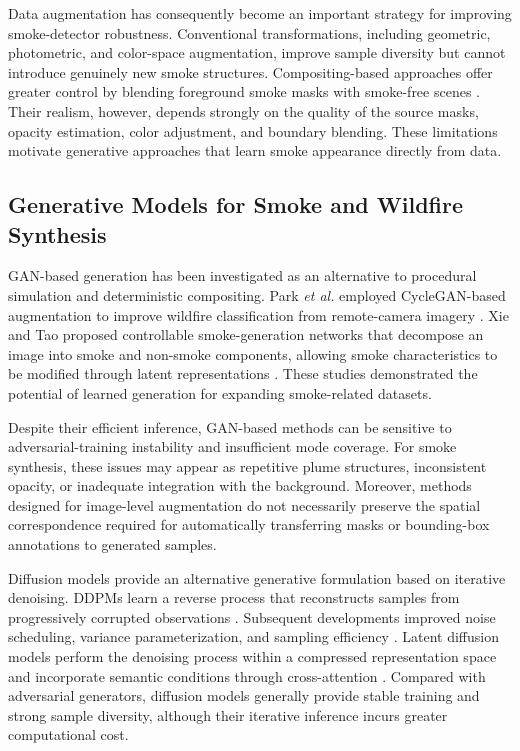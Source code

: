 \documentclass[journal]{IEEEtran}
\begin{document}
Data augmentation has consequently become an important strategy for
improving smoke-detector robustness. Conventional transformations,
including geometric, photometric, and color-space augmentation, improve
sample diversity but cannot introduce genuinely new smoke structures.
Compositing-based approaches offer greater control by blending
foreground smoke masks with smoke-free scenes
\cite{6425498}. Their realism,
however, depends strongly on the quality of the source masks, opacity
estimation, color adjustment, and boundary blending. These limitations
motivate generative approaches that learn smoke appearance directly
from data.


\subsection{Generative Models for Smoke and Wildfire Synthesis}
\label{subsec:related_generative_smoke}

GAN-based generation has been investigated as an alternative to
procedural simulation and deterministic compositing. Park
\emph{et al.} employed CycleGAN-based augmentation to improve wildfire
classification from remote-camera imagery
\cite{rs12223715}. Xie and Tao proposed controllable smoke-generation
networks that decompose an image into smoke and non-smoke components,
allowing smoke characteristics to be modified through latent
representations
\cite{9249044}. These studies demonstrated the potential of learned
generation for expanding smoke-related datasets.

Despite their efficient inference, GAN-based methods can be sensitive
to adversarial-training instability and insufficient mode coverage.
For smoke synthesis, these issues may appear as repetitive plume
structures, inconsistent opacity, or inadequate integration with the
background. Moreover, methods designed for image-level augmentation do
not necessarily preserve the spatial correspondence required for
automatically transferring masks or bounding-box annotations to
generated samples.

Diffusion models provide an alternative generative formulation based
on iterative denoising. DDPMs learn a reverse process that reconstructs
samples from progressively corrupted observations
\cite{ho2020denoisingdiffusionprobabilisticmodels}. Subsequent
developments improved noise scheduling, variance parameterization, and
sampling efficiency
\cite{nichol2021improveddenoisingdiffusionprobabilistic}. Latent
diffusion models perform the denoising process within a compressed
representation space and incorporate semantic conditions through
cross-attention
\cite{rombach2022highresolutionimagesynthesislatent}. Compared with
adversarial generators, diffusion models generally provide stable
training and strong sample diversity, although their iterative
inference incurs greater computational cost.
\end{document}
